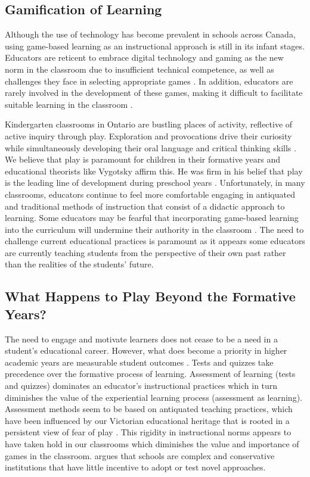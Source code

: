 \documentclass{article}
\begin{document}
\subsection{Gamification of Learning}

Although the use of technology has become prevalent in schools across Canada, using game-based learning as an instructional approach is still in its infant stages. Educators are reticent to embrace digital technology and gaming as the new norm in the classroom due to insufficient technical competence, as well as challenges they face in selecting appropriate games \citep{jaaska2022teachers,molin2017role}. In addition, educators are rarely involved in the development of these games, making it difficult to facilitate suitable learning in the classroom \citep{molin2017role}. 

Kindergarten classrooms in Ontario are bustling places of activity, reflective of active inquiry through play. Exploration and provocations drive their curiosity while simultaneously developing their oral language and critical thinking skills \citep{kindergartencurriculum}. We believe that play is paramount for children in their formative years and educational theorists like Vygotsky affirm this. He was firm in his belief that play is the leading line of development during preschool years \citep{vygotsky1967play}. Unfortunately, in many classrooms, educators continue to feel more comfortable engaging in antiquated and traditional methods of instruction that consist of a didactic approach to learning. Some educators may be fearful that incorporating game-based learning into the curriculum will undermine their authority in the classroom \citep{jaaska2022teachers,chee2014facilitating,jong2016teachers}. The need to challenge current educational practices is paramount as it appears some educators are currently teaching students from the perspective of their own past rather than the realities of the students’ future. 

\subsection{What Happens to Play Beyond the Formative Years?}

The need to engage and motivate learners does not cease to be a need in a student’s educational career. However, what does become a priority in higher academic years are measurable student outcomes \citep{ball2012politics,shore2010beyond,leather2021pedagogy}. Tests and quizzes take precedence over the formative process of learning. Assessment of learning (tests and quizzes) dominates an educator’s instructional practices which in turn diminishes the value of the experiential learning process (assessment as learning). Assessment methods seem to be based on antiquated teaching practices, which have been influenced by our Victorian educational heritage that is rooted in a persistent view of fear of play \citep{wood2013play}. This rigidity in instructional norms appears to have taken hold in our classrooms which diminishes the value and importance of games in the classroom. \citet{reich2020failure} argues that schools are complex and conservative institutions that have little incentive to adopt or test novel approaches. 
\end{document}
